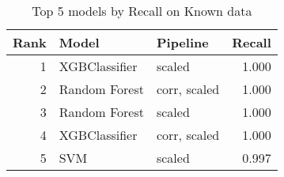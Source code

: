 \begin{table}[!htb]
\caption{Top 5 models by Recall on Known data}
\label{table-top-5-recall-known}
\centering
\begin{tabular}{rllr}
\toprule
Rank & Model & Pipeline & Recall \\
\midrule
1 & XGBClassifier & scaled & 1.000 \\
2 & Random Forest & corr, scaled & 1.000 \\
3 & Random Forest & scaled & 1.000 \\
4 & XGBClassifier & corr, scaled & 1.000 \\
5 & SVM & scaled & 0.997 \\
\bottomrule
\end{tabular}
\end{table}
